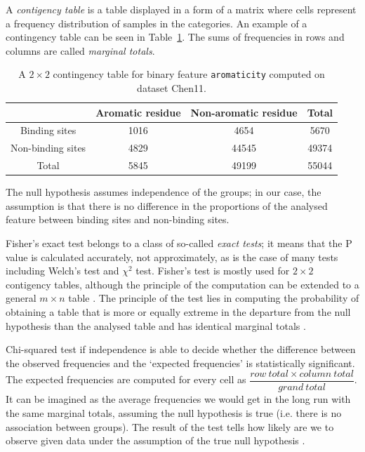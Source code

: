 A \textit{contigency table} is a table displayed in a form of a matrix where cells represent a frequency distribution of samples in the categories. An example of a contingency table can be seen in Table~\ref{tab:contingency_table_example}. The sums of frequencies in rows and columns are called \textit{marginal totals}.

\begin{table}[!htbp]
\centering
\renewcommand{\arraystretch}{1.5}
 \begin{tabular}{|c|c|c||c|} 
 \hline
  & Aromatic residue & Non-aromatic residue & Total \\ [0.5ex] 
 \hline
 Binding sites & 1016 & 4654 & 5670 \\ 
 \hline
 Non-binding sites & 4829 & 44545 & 49374 \\
 \hline\hline
 Total & 5845 & 49199 & 55044 \\
 \hline
\end{tabular}
\caption{A $2\times 2$ contingency table for binary feature \texttt{aromaticity} computed on dataset Chen11.}\label{tab:contingency_table_example}
\end{table}

The null hypothesis assumes independence of the groups; in our case, the assumption is that there is no difference in the proportions of the analysed feature between binding sites and non-binding sites.

Fisher's exact test belongs to a class of so-called \textit{exact tests}; it means that the P value is calculated accurately, not approximately, as is the case of many tests including Welch's test and $\chi^{2}$ test. Fisher's test is mostly used for $2\times 2$ contigency tables, although the principle of the computation can be extended to a general $m\times n$ table \cite{Mehta}. The principle of the test lies in computing the probability of obtaining a table that is more or equally extreme in the departure from the null hypothesis than the analysed table and has identical marginal totals \cite{bland}.

Chi-squared test if independence is able to decide whether the difference between the observed frequencies and the `expected frequencies' is statistically significant. The expected frequencies are computed for every cell as 
$\dfrac{row\: total\times column\:total}{grand\:total}$.
It can be imagined as the average frequencies we would get in the long run with the same marginal totals, assuming the null hypothesis is true (i.e. there is no association between groups). The result of the test tells how likely are we to observe given data under the assumption of the true null hypothesis \cite{bland}.

